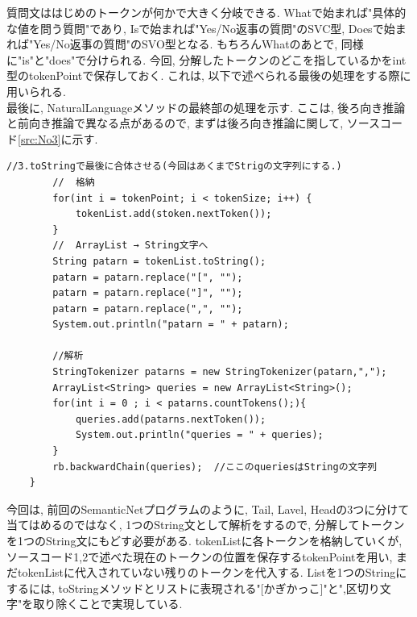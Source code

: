 \documentclass[uplatex,12pt]{jsarticle}
\begin{document}
質問文ははじめのトークンが何かで大きく分岐できる. Whatで始まれば"具体的な値を問う質問"であり, Isで始まれば"Yes/No返事の質問"のSVC型, Doesで始まれば"Yes/No返事の質問"のSVO型となる. もちろんWhatのあとで, 同様に"is"と"does"で分けられる. 今回, 分解したトークンのどこを指しているかをint型のtokenPointで保存しておく. これは, 以下で述べられる最後の処理をする際に用いられる. \\

最後に, NaturalLanguageメソッドの最終部の処理を示す. ここは, 後ろ向き推論と前向き推論で異なる点があるので, まずは後ろ向き推論に関して, ソースコード\ref{src:No3}に示す.
\begin{lstlisting}[caption=NaturalLanguageメソッドその3(後ろ向き推論の場合), label=src:No3]
    	//3.toStringで最後に合体させる(今回はあくまでStrigの文字列にする.)
    	//  格納
    	for(int i = tokenPoint; i < tokenSize; i++) {
    		tokenList.add(stoken.nextToken());
    	}
    	//  ArrayList → String文字へ
    	String patarn = tokenList.toString();
    	patarn = patarn.replace("[", "");
    	patarn = patarn.replace("]", "");
    	patarn = patarn.replace(",", "");
    	System.out.println("patarn = " + patarn);

    	//解析
	    StringTokenizer patarns = new StringTokenizer(patarn,",");
	    ArrayList<String> queries = new ArrayList<String>();
	    for(int i = 0 ; i < patarns.countTokens();){
	    	queries.add(patarns.nextToken());
	    	System.out.println("queries = " + queries);
	    }
	    rb.backwardChain(queries);	//ここのqueriesはStringの文字列
    }
\end{lstlisting}

今回は, 前回のSemanticNetプログラムのように, Tail, Lavel, Headの3つに分けて当てはめるのではなく, 1つのString文として解析をするので, 分解してトークンを1つのString文にもどす必要がある. tokenListに各トークンを格納していくが, ソースコード1,2で述べた現在のトークンの位置を保存するtokenPointを用い, まだtokenListに代入されていない残りのトークンを代入する. Listを1つのStringにするには, toStringメソッドとリストに表現される"[かぎかっこ]"と",区切り文字"を取り除くことで実現している.\\
\end{document}
